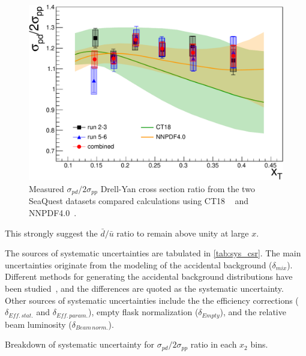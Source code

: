 \documentclass[reprint,aps,unsortedaddress,superscriptaddress,prl,floatfix,showpacs,linenumbers,final]{revtex4-2}
\begin{document}
\begin{figure}[htbp!]
	\centering
	\includegraphics[width=\linewidth]{data_full_xT_syst.pdf}
	\caption{Measured $\sigma_{pd}/2\sigma_{pp}$ Drell-Yan cross section ratio from the two SeaQuest datasets compared calculations using
		CT18 ~\cite{hou2021} and NNPDF4.0~\cite{ball2022a}.}%
	\label{fig:xT_csr}
\end{figure}
This strongly suggest the $\bar{d}/\bar{u}$ ratio to remain above unity at large $x$.

The sources of systematic uncertainties are tabulated in \cref{tab:sys_csr}.
The main uncertainties originate from the modeling of the accidental background ($\delta_{mix}$).
Different methods for generating the accidental background distributions have been studied~\cite{pate2023},
and the differences are quoted as the systematic uncertainty.
Other sources of systematic uncertainties include the the efficiency corrections ($\delta_{Eff.\,stat.}$ and $\delta_{Eff.\,param.}$),
empty flask normalization ($\delta_{Empty}$), and the relative beam luminosity ($\delta_{Beam\,norm.}$).
\begin{table}
	\centering
	\caption{Breakdown of systematic uncertainty for $\sigma_{pd}/2\sigma_{pp}$ ratio in each $x_2$ bins.}
	\label{tab:sys_csr}
	\begin{adjustbox}{max width=\linewidth}
		
	\end{adjustbox}
\end{table}
\end{document}
